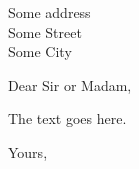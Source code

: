 \documentclass{letter}
\begin{document}
\begin{letter}{Some address\\Some Street\\Some City}

\opening{Dear Sir or Madam,}

The text goes here.

\closing{Yours,}
\end{letter}
\end{document}
